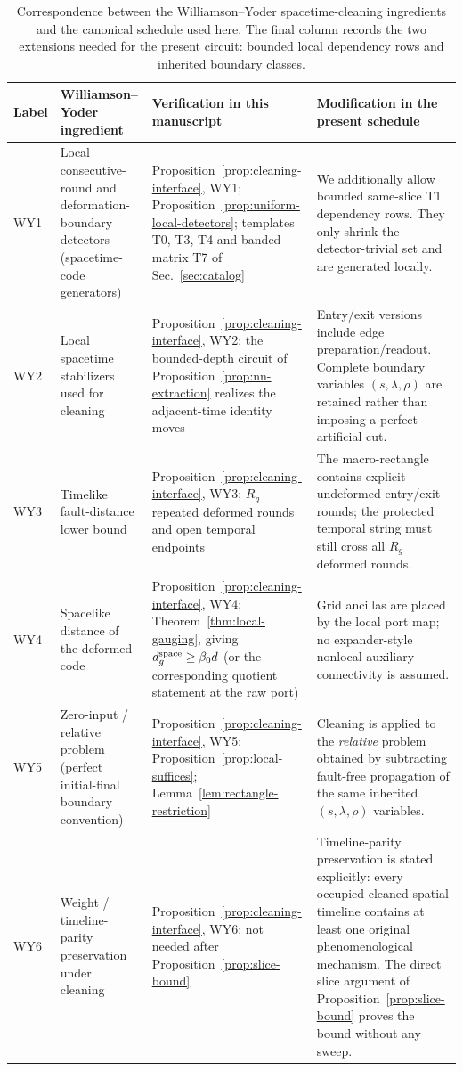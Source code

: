 \documentclass[aps,prx,reprint,superscriptaddress,nofootinbib,floatfix,longbibliography]{revtex4-2}
\theoremstyle{definition}
\begin{document}
\begin{table}[t]
\caption{Correspondence between the Williamson--Yoder spacetime-cleaning ingredients and the canonical schedule used here.  The final column records the two extensions needed for the present circuit: bounded local dependency rows and inherited boundary classes.}
\label{tab:cleaning-map}
\scriptsize
\setlength{\tabcolsep}{4pt}
\renewcommand{\arraystretch}{1.15}
\begin{tabular}{@{}p{1.1cm}p{2.6cm}p{4.8cm}p{6.8cm}@{}}
\toprule
Label & Williamson--Yoder ingredient & Verification in this manuscript & Modification in the present schedule \\
\midrule
WY1 & Local consecutive-round and deformation-boundary detectors (spacetime-code generators) & Proposition~\ref{prop:cleaning-interface}, WY1; Proposition~\ref{prop:uniform-local-detectors}; templates T0, T3, T4 and banded matrix T7 of Sec.~\ref{sec:catalog} & We additionally allow bounded same-slice T1 dependency rows.  They only shrink the detector-trivial set and are generated locally. \\
WY2 & Local spacetime stabilizers used for cleaning & Proposition~\ref{prop:cleaning-interface}, WY2; the bounded-depth circuit of Proposition~\ref{prop:nn-extraction} realizes the adjacent-time identity moves & Entry/exit versions include edge preparation/readout.  Complete boundary variables $(s,\lambda,\rho)$ are retained rather than imposing a perfect artificial cut. \\
WY3 & Timelike fault-distance lower bound & Proposition~\ref{prop:cleaning-interface}, WY3; $R_g$ repeated deformed rounds and open temporal endpoints & The macro-rectangle contains explicit undeformed entry/exit rounds; the protected temporal string must still cross all $R_g$ deformed rounds. \\
WY4 & Spacelike distance of the deformed code & Proposition~\ref{prop:cleaning-interface}, WY4; Theorem~\ref{thm:local-gauging}, giving $d_g^{\rm space}\ge\beta_0d$ (or the corresponding quotient statement at the raw port) & Grid ancillas are placed by the local port map; no expander-style nonlocal auxiliary connectivity is assumed. \\
WY5 & Zero-input / relative problem (perfect initial-final boundary convention) & Proposition~\ref{prop:cleaning-interface}, WY5; Proposition~\ref{prop:local-suffices}; Lemma~\ref{lem:rectangle-restriction} & Cleaning is applied to the \emph{relative} problem obtained by subtracting fault-free propagation of the same inherited $(s,\lambda,\rho)$ variables. \\
WY6 & Weight / timeline-parity preservation under cleaning & Proposition~\ref{prop:cleaning-interface}, WY6; not needed after Proposition~\ref{prop:slice-bound} & Timeline-parity preservation is stated explicitly: every occupied cleaned spatial timeline contains at least one original phenomenological mechanism.  The direct slice argument of Proposition~\ref{prop:slice-bound} proves the bound without any sweep. \\
\bottomrule
\end{tabular}
\end{table}
\end{document}
